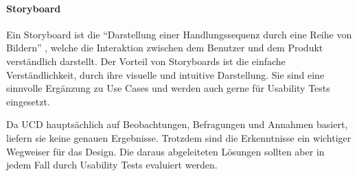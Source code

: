 \paragraph{Storyboard}
Ein Storyboard ist die \enquote{Darstellung einer Handlungssequenz durch eine Reihe von Bildern}
\autocite{Moser.2012}
, welche die Interaktion zwischen dem Benutzer und dem Produkt verständlich darstellt.
Der Vorteil von Storyboards ist die einfache Verständlichkeit, durch ihre visuelle und intuitive Darstellung.
Sie sind eine sinnvolle Ergänzung zu Use Cases und werden auch gerne für Usability Tests eingesetzt.

Da \acl{UCD} hauptsächlich auf Beobachtungen, Befragungen und Annahmen basiert, liefern sie keine genauen Ergebnisse. Trotzdem sind die Erkenntnisse ein wichtiger Wegweiser für das Design. Die daraus abgeleiteten Lösungen sollten aber in jedem Fall durch Usability Tests evaluiert werden.